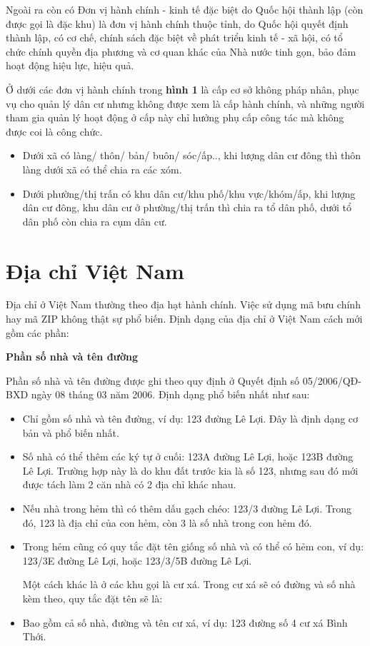 Ngoài ra còn có Đơn vị hành chính - kinh tế đặc biệt do Quốc hội thành lập (còn được  gọi là đặc khu) là đơn vị hành chính thuộc tỉnh, do Quốc hội quyết định thành lập, có cơ chế, chính sách đặc biệt về phát triển kinh tế - xã hội, có tổ chức chính quyền địa phương và cơ quan khác của Nhà nước tinh gọn, bảo đảm hoạt động hiệu lực, hiệu quả.

Ở dưới các đơn vị hành chính trong \textbf{hình 1} là cấp cơ sở không pháp nhân, phục vụ cho quản lý dân cư nhưng không được xem là cấp hành chính, và những người tham gia quản lý hoạt động ở cấp này chỉ hưởng phụ cấp công tác mà không được coi là công chức.
\begin{itemize}
    \item Dưới xã có làng/ thôn/ bản/ buôn/ sóc/ấp.., khi lượng dân cư đông thì thôn làng dưới xã có thể chia ra các xóm.
    \item Dưới phường/thị trấn có khu dân cư/khu phố/khu vực/khóm/ấp, khi lượng dân cư đông, khu dân cư ở phường/thị trấn thì chia ra tổ dân phố, dưới tổ dân phố còn chia ra cụm dân cư.
\end{itemize}
\section{Địa chỉ Việt Nam}
Địa chỉ ở Việt Nam thường theo địa hạt hành chính. Việc sử dụng mã bưu chính hay mã ZIP không thật sự phổ biến.
Định dạng của địa chỉ ở Việt Nam cách mới gồm các phần:

\vspace*{0.5cm}
\textbf{Phần số nhà và tên đường}

Phần số nhà và tên đường được ghi theo quy định ở Quyết định số 05/2006/QĐ-BXD ngày 08 tháng 03 năm 2006. Định dạng phổ biến nhất như sau:
\begin{itemize}
    \item Chỉ gồm số nhà và tên đường, ví dụ: 123 đường Lê Lợi. Đây là định dạng cơ bản và phổ biến nhất.
    \item Số nhà có thể thêm các ký tự ở cuối: 123A đường Lê Lợi, hoặc 123B đường Lê Lợi. Trường hợp này là do khu đất trước kia là số 123, nhưng sau đó mới được tách làm 2 căn nhà có 2 địa chỉ khác nhau.
    \item Nếu nhà trong hẻm thì có thêm dấu gạch chéo: 123/3 đường Lê Lợi. Trong đó, 123 là địa chỉ của con hẻm, còn 3 là số nhà trong con hẻm đó.
    \item Trong hẻm cũng có quy tắc đặt tên giống số nhà và có thể có hẻm con, ví dụ: 123/3E đường Lê Lợi, hoặc 123/3/5B đường Lê Lợi.
    
Một cách khác là ở các khu gọi là cư xá. Trong cư xá sẽ có đường và số nhà kèm theo, quy tắc đặt tên sẽ là:
    \item Bao gồm cả số nhà, đường và tên cư xá, ví dụ: 123 đường số 4 cư xá Bình Thới.
\end{itemize}

